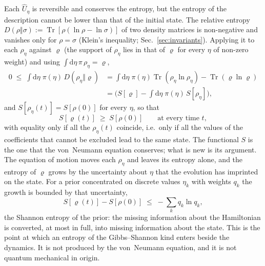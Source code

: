 \documentclass[10pt,a4paper]{article}
\newcommand{\dd}{\mathrm{d}}
\newcommand{\Tr}{\operatorname{Tr}}
\begin{document}
Each $ \hat U_\eta $ is reversible and conserves the entropy, but the entropy of the description cannot be lower than that of the initial state.
The relative entropy $ D(\rho \Vert \sigma) := \Tr[\rho(\ln\rho - \ln\sigma)] $ of two density matrices is non-negative and vanishes only for $ \rho = \sigma $ (Klein's inequality; Sec.~\ref{sec:invariants}).
Applying it to each $ \rho_\eta $ against $ \varrho $ (the support of $ \rho_\eta $ lies in that of $ \varrho $ for every $ \eta $ of non-zero weight) and using $ \int \dd\eta\,\pi\,\rho_\eta = \varrho $,
\[
  \begin{aligned}
  0 \;\leq\; \int\!\dd\eta\;\pi(\eta)\,D(\rho_\eta \Vert \varrho)
  &= \int\!\dd\eta\;\pi(\eta)\Tr(\rho_\eta\ln\rho_\eta) - \Tr(\varrho\ln\varrho) \\
  &= \Big(S[\varrho] - \int\!\dd\eta\;\pi(\eta)\,S[\rho_\eta]\Big) ,
  \end{aligned}
\]
and $ S[\rho_\eta(t)] = S[\rho(0)] $ for every $ \eta $, so that
\begin{equation}\label{eq:prior_entropy}
  S[\varrho(t)] \;\geq\; S[\rho(0)] \qquad\text{at every time } t ,
\end{equation}
with equality only if all the $ \rho_\eta(t) $ coincide, i.e.\ only if all the values of the coefficients that cannot be excluded lead to the same state.
The functional $ S $ is the one that the von~Neumann equation conserves; what is new is its argument.
The equation of motion moves each $ \rho_\eta $ and leaves its entropy alone, and the entropy of $ \varrho $ grows by the uncertainty about $ \eta $ that the evolution has imprinted on the state.
For a prior concentrated on discrete values $ \eta_k $ with weights $ q_k $ the growth is bounded by that uncertainty,
\[
  S[\varrho(t)] - S[\rho(0)] \;\leq\; -\sum_kq_k\ln q_k ,
\]
the Shannon entropy of the prior: the missing information about the Hamiltonian is converted, at most in full, into missing information about the state.
This is the point at which an entropy of the Gibbs--Shannon kind enters beside the dynamics.
It is not produced by the von~Neumann equation, and it is not quantum mechanical in origin.
\end{document}
